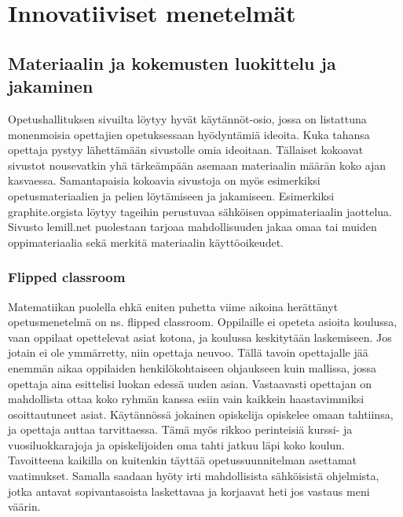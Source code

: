 \documentclass[utf8,bachelor]{gradu3}
\begin{document}
\chapter{Innovatiiviset menetelmät}

\section{Materiaalin ja kokemusten luokittelu ja jakaminen}
Opetushallituksen sivuilta löytyy hyvät käytännöt-osio, jossa on listattuna monenmoisia opettajien opetuksessaan hyödyntämiä ideoita. \parencite[][]{hyvatkaytannot} Kuka tahansa opettaja pystyy lähettämään sivustolle omia ideoitaan. Tällaiset kokoavat sivustot nousevatkin yhä tärkeämpään asemaan materiaalin määrän koko ajan kasvaessa. Samantapaisia kokoavia sivustoja on myös esimerkiksi opetusmateriaalien ja pelien löytämiseen ja jakamiseen. Esimerkiksi graphite.orgista löytyy tageihin perustuvaa sähköisen oppimateriaalin jaottelua. Sivusto lemill.net puolestaan tarjoaa mahdollisuuden jakaa omaa tai muiden oppimateriaalia sekä merkitä materiaalin käyttöoikeudet.

\subsection{Flipped classroom} %
Matematiikan puolella \parencite[][]{maot} ehkä eniten puhetta viime aikoina herättänyt opetusmenetelmä on ns. flipped classroom.\parencite[][]{flipped} Oppilaille ei opeteta asioita koulussa, vaan oppilaat opettelevat asiat kotona, ja koulussa keskitytään laskemiseen. Jos jotain ei ole ymmärretty, niin opettaja neuvoo. Tällä tavoin opettajalle jää enemmän aikaa oppilaiden henkilökohtaiseen ohjaukseen kuin mallissa, jossa opettaja aina esittelisi luokan edessä uuden asian. Vastaavasti opettajan on mahdollista ottaa koko ryhmän kanssa esiin vain kaikkein haastavimmiksi osoittautuneet asiat. Käytännössä jokainen opiskelija opiskelee omaan tahtiinsa, ja opettaja auttaa tarvittaessa. Tämä myös rikkoo perinteisiä kurssi- ja vuosiluokkarajoja ja opiskelijoiden oma tahti jatkuu läpi koko koulun. Tavoitteena kaikilla on kuitenkin täyttää opetussuunnitelman asettamat vaatimukset. Samalla saadaan hyöty irti mahdollisista sähköisistä ohjelmista, jotka antavat sopivantasoista laskettavaa ja korjaavat heti jos vastaus meni väärin.
\end{document}
